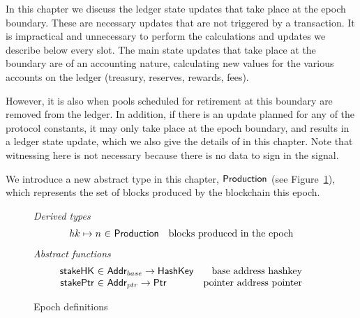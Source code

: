 \newcommand{\UTxOEpState}{\type{UTxOEpState}}
\newcommand{\Accnt}{\type{Accnt}}
\newcommand{\AccntEnv}{\type{AccntEnv}}
\newcommand{\AccntState}{\type{AccntState}}
\newcommand{\StPlCleanEnv}{\type{StPlCleanEnv}}
\newcommand{\StPlCleanState}{\type{StPlCleanState}}
\newcommand{\NewProtoConstsEnv}{\type{NewProtoConstsEnv}}
\newcommand{\NewProtoConstsState}{\type{NewProtoConstsState}}
\newcommand{\EpochEnv}{\type{EpochEnv}}
\newcommand{\EpochState}{\type{EpochState}}
\newcommand{\Production}{\type{Production}}

\newcommand{\obligation}[4]{\fun{obligation}~ \var{#1}~ \var{#2}~ \var{#3}~ \var{#4}}
\newcommand{\reward}[5]{\fun{reward}~ \var{#1}~ \var{#2}~ \var{#3}~ \var{#4}~ \var{#5}}
\newcommand{\isActive}[4]{\fun{isActive}~ \var{#1}~ \var{#2}~ \var{#3}~ \var{#4}}
\newcommand{\activeStake}[5]{\fun{activeStake}~ \var{#1}~ \var{#2}~ \var{#3}~ \var{#4}~ \var{#5}}
\newcommand{\poolRefunds}[3]{\fun{poolRefunds}~ \var{#1}~ \var{#2}~ \var{#3}}

In this chapter we discuss the ledger state updates that take place at the epoch
boundary. These are necessary updates that are not triggered by a transaction.
It is impractical and unnecessary to perform the calculations and updates we
describe below every slot. The main state updates that take place at the boundary
are of an accounting nature, calculating new values for the various accounts
on the ledger (treasury, reserves, rewards, fees).

However, it is also when
pools scheduled for retirement at this boundary are removed from the ledger.
In addition, if there is an update planned for any of the protocol constants,
it may only take place at the epoch boundary, and results in a ledger state
update, which we also give the details of in this chapter.
Note that witnessing here is not necessary because there is no data to sign
in the signal.

We introduce a new abstract type in this chapter, $\Production$ (see
Figure~\ref{fig:epoch-defs}), which represents the set of blocks produced by the
blockchain this epoch.

\begin{figure}[htb]
  \emph{Derived types}
  \begin{equation*}
    \begin{array}{r@{~\in~}lr}
      hk \mapsto n & \Production & \text{blocks produced in the epoch}
    \end{array}
  \end{equation*}
  \emph{Abstract functions}
  \begin{equation*}
    \begin{array}{r@{~\in~}lr}
      \fun{stakeHK} & \Addr_{base} \to \HashKey
      & \text{base address hashkey}\\
      \fun{stakePtr} & \Addr_{ptr} \to \Ptr
      & \text{pointer address pointer}\\
    \end{array}
  \end{equation*}
  \caption{Epoch definitions}
  \label{fig:epoch-defs}
\end{figure}


